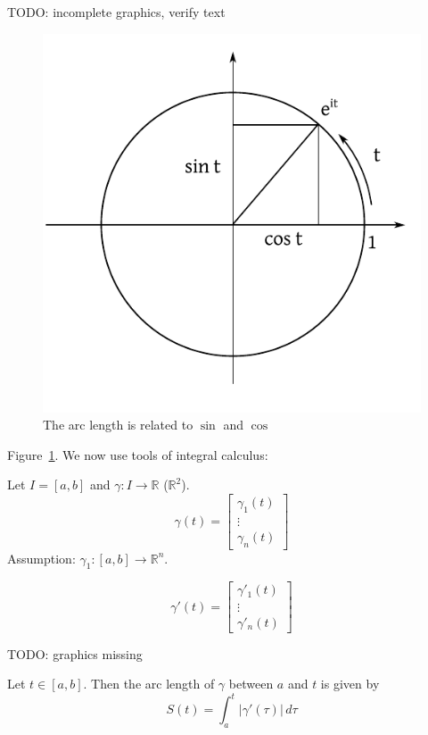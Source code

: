 \documentclass[a4paper,landscape,twocolumn]{article}
\theoremstyle{definition}
\newcommand\abs[1]{\left|#1\right|}
\begin{document}
TODO: incomplete graphics, verify text

\begin{figure}[!h]
  \begin{center}
    \includegraphics{img/arc-length-sincos.pdf}
    \caption{The arc length is related to $\sin$ and $\cos$}
    \label{img:arc-length}
  \end{center}
\end{figure}

Figure~\ref{img:arc-length}. We now use tools of integral calculus:

Let $I = [a,b]$ and $\gamma: I \to \mathbb R$ ($\mathbb R^2$).
\[ \gamma(t) = \begin{bmatrix} \gamma_1(t) \\ \vdots \\ \gamma_n(t) \end{bmatrix} \]
Assumption: $\gamma_1: [a,b] \to \mathbb R^n$.

\[ \gamma'(t) = \begin{bmatrix} \gamma'_1(t) \\ \vdots \\ \gamma'_n(t) \end{bmatrix} \]

TODO: graphics missing

Let $t \in [a,b]$. Then the arc length of $\gamma$ between $a$ and $t$
is given by
\[ S(t) = \int_a^t \abs{\gamma'(\tau)} \, d\tau \]
\end{document}
